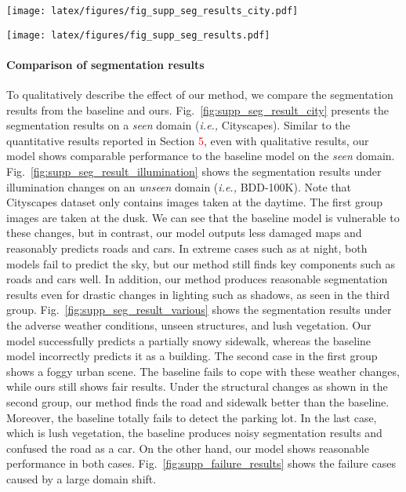 \documentclass[final]{latex/cvpr}
\newcommand{\todow}[1]{\textcolor{red}{#1}}
\begin{document}
\begin{figure*}[!t]
\centering
  \texttt{[image: latex/figures/fig\_supp\_seg\_results\_city.pdf]}
\caption{Segmentation results on \emph{seen} domain images (\textit{i.e.,} Cityscapes).}
\label{fig:supp_seg_result_city}
\end{figure*}

\begin{figure*}[!b]
\vspace*{-0.2cm}
\centering
  \texttt{[image: latex/figures/fig\_supp\_seg\_results.pdf]}
  \caption{Segmentation results under illumination changes (\textit{i.e.,} dusk, night, and shadow) in BDD-100K with the models trained on Cityscapes.}
\label{fig:supp_seg_result_illumination}
\end{figure*}

\paragraph{Comparison of segmentation results}
\vspace*{-0.3cm}
To qualitatively describe the effect of our method, we compare the segmentation results from the baseline and ours.
Fig.~\ref{fig:supp_seg_result_city} presents the segmentation results on a \emph{seen} domain (\textit{i.e.,} Cityscapes).
Similar to the quantitative results reported in Section \todow{5}, even with qualitative results, our model shows comparable performance to the baseline model on the \emph{seen} domain.
Fig.~\ref{fig:supp_seg_result_illumination} shows the segmentation results under illumination changes on an \emph{unseen} domain (\textit{i.e.,} BDD-100K). 
Note that Cityscapes dataset only contains images taken at the daytime. 
The first group images are taken at the dusk.
We can see that the baseline model is vulnerable to these changes, but in contrast, our model outputs less damaged maps and reasonably predicts roads and cars.
In extreme cases such as at night, both models fail to predict the sky, but our method still finds key components such as roads and cars well. 
In addition, our method produces reasonable segmentation results even for drastic changes in lighting such as shadows, as seen in the third group.
Fig.~\ref{fig:supp_seg_result_various} shows the segmentation results under the adverse weather conditions, unseen structures, and lush vegetation.
Our model successfully predicts a partially snowy sidewalk, whereas the baseline model incorrectly predicts it as a building.
The second case in the first group shows a foggy urban scene. The baseline fails to cope with these weather changes, while ours still shows fair results. Under the structural changes as shown in the second group, our method finds the road and sidewalk better than the baseline. Moreover, the baseline totally fails to detect the parking lot. In the last case, which is lush vegetation, the baseline produces noisy segmentation results and confused the road as a car. On the other hand, our model shows reasonable performance in both cases. Fig.~\ref{fig:supp_failure_results} shows the failure cases caused by a large domain shift.
\end{document}
